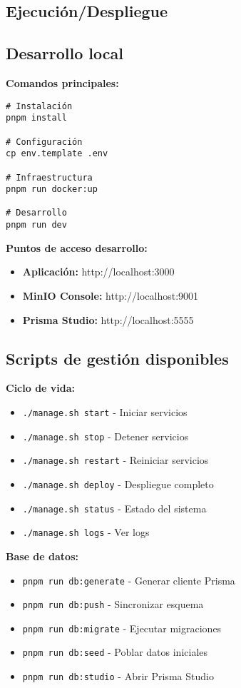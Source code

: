 \documentclass[12pt,a4paper]{article}
\begin{document}
\begin{enumerate}
\section{Ejecución/Despliegue}

\subsection{Desarrollo local}

\textbf{Comandos principales:}
\begin{verbatim}
# Instalación
pnpm install

# Configuración
cp env.template .env

# Infraestructura
pnpm run docker:up

# Desarrollo
pnpm run dev
\end{verbatim}

\textbf{Puntos de acceso desarrollo:}
\begin{itemize}
    \item \textbf{Aplicación:} http://localhost:3000
    \item \textbf{MinIO Console:} http://localhost:9001
    \item \textbf{Prisma Studio:} http://localhost:5555
\end{itemize}

\subsection{Scripts de gestión disponibles}

\textbf{Ciclo de vida:}
\begin{itemize}
    \item \texttt{./manage.sh start} - Iniciar servicios
    \item \texttt{./manage.sh stop} - Detener servicios
    \item \texttt{./manage.sh restart} - Reiniciar servicios
    \item \texttt{./manage.sh deploy} - Despliegue completo
    \item \texttt{./manage.sh status} - Estado del sistema
    \item \texttt{./manage.sh logs} - Ver logs
\end{itemize}

\textbf{Base de datos:}
\begin{itemize}
    \item \texttt{pnpm run db:generate} - Generar cliente Prisma
    \item \texttt{pnpm run db:push} - Sincronizar esquema
    \item \texttt{pnpm run db:migrate} - Ejecutar migraciones
    \item \texttt{pnpm run db:seed} - Poblar datos iniciales
    \item \texttt{pnpm run db:studio} - Abrir Prisma Studio
\end{itemize}


\end{enumerate}
\end{document}
